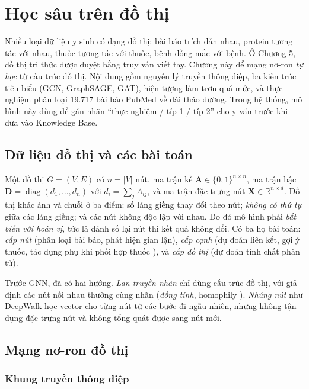 \chapter{Học sâu trên đồ thị}
\label{chap:gnn}

Nhiều loại dữ liệu y sinh có dạng đồ thị: bài báo trích dẫn nhau, protein tương tác với nhau, thuốc tương tác với thuốc, bệnh đồng mắc với bệnh. Ở Chương 5, đồ thị tri thức được duyệt bằng truy vấn viết tay. Chương này để mạng nơ-ron \emph{tự học} từ cấu trúc đồ thị. Nội dung gồm nguyên lý truyền thông điệp, ba kiến trúc tiêu biểu (GCN, GraphSAGE, GAT), hiện tượng làm trơn quá mức, và thực nghiệm phân loại 19.717 bài báo PubMed về đái tháo đường. Trong hệ thống, mô hình này dùng để gán nhãn ``thực nghiệm / típ 1 / típ 2'' cho y văn trước khi đưa vào Knowledge Base.

\section{Dữ liệu đồ thị và các bài toán}

Một đồ thị $G=(V,E)$ có $n=|V|$ nút, ma trận kề $\mathbf A\in\{0,1\}^{n\times n}$, ma trận bậc $\mathbf D=\operatorname{diag}(d_1,\ldots,d_n)$ với $d_i=\sum_j A_{ij}$, và ma trận đặc trưng nút $\mathbf X\in\mathbb R^{n\times d}$. Đồ thị khác ảnh và chuỗi ở ba điểm: số láng giềng thay đổi theo nút; \emph{không có thứ tự} giữa các láng giềng; và các nút không độc lập với nhau. Do đó mô hình phải \emph{bất biến với hoán vị}, tức là đánh số lại nút thì kết quả không đổi. Có ba họ bài toán: \emph{cấp nút} (phân loại bài báo, phát hiện gian lận), \emph{cấp cạnh} (dự đoán liên kết, gợi ý thuốc, tác dụng phụ khi phối hợp thuốc \cite{zitnik2018}), và \emph{cấp đồ thị} (dự đoán tính chất phân tử).

Trước GNN, đã có hai hướng. \emph{Lan truyền nhãn} \cite{zhou2004} chỉ dùng cấu trúc đồ thị, với giả định các nút nối nhau thường cùng nhãn (\emph{đồng tính}, homophily \cite{mcpherson2001}). \emph{Nhúng nút} như DeepWalk \cite{perozzi2014} học vector cho từng nút từ các bước đi ngẫu nhiên, nhưng không tận dụng đặc trưng nút và không tổng quát được sang nút mới.

\section{Mạng nơ-ron đồ thị}

\subsection{Khung truyền thông điệp}

